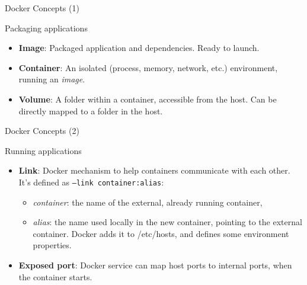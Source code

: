 \documentclass[presentation,c]{beamer}
\begin{document}
{
\begin{frame}[label=sec-9-3]{Docker Concepts (1)}

\begin{block}{Packaging applications}

\begin{itemize}
\item \textbf{Image}: Packaged application and dependencies. Ready to launch.
\item \textbf{Container}: An isolated (process, memory, network, etc.) environment, running an \textit{image}.
\item \textbf{Volume}: A folder within a container, accessible from the host. Can be directly mapped to a folder in the host.
\end{itemize}
\end{block}
\end{frame}
} %

{
\begin{frame}[label=sec-9-4]{Docker Concepts (2)}

\begin{block}{Running applications}

\begin{itemize}
\item \textbf{Link}: Docker mechanism to help containers communicate with each other. It's defined as \texttt{--link container:alias}:
\begin{itemize}
\item \textit{container}: the name of the external, already running container,
\item \textit{alias}: the name used locally in the new container, pointing to the external container. Docker adds it to /etc/hosts, and defines some environment properties.
\end{itemize}
\item \textbf{Exposed port}: Docker service can map host ports to internal ports, when the container starts.
\end{itemize}
\end{block}
\end{frame}
} %
\end{document}
